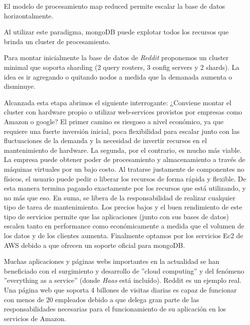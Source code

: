 El modelo de procesamiento map reduced permite escalar la base de datos horizontalmente.

Al utilizar este paradigma, mongoDB puede explotar todos los recursos que brinda un cluster de procesamiento.

Para montar inicialmente la base de datos de \emph{Reddit} proponemos un cluster minimal que soporta sharding (2 query routers, 3 config servers y 2 shards).
La idea es ir agregando o quitando nodos a medida que la demanada aumenta o disminuye.

Alcanzada esta etapa abrimos el siguiente interrogante: ¿Conviene montar el cluster con hardware propio o utilizar web-services provistos por empresas como 
Amazon o google? El primer camino es riesgoso a nivel económico, ya que requiere una fuerte inversión inicial, poca flexibilidad para escalar 
junto con las fluctuaciones de la demanda 
y la necesidad de invertir
recursos en el mantenimiento de hardware. La segunda, por el contrario, es mucho más viable. La empresa puede obtener poder de procesamiento y almacenamiento
a través de máquinas virtuales por un bajo costo. Al tratarse justamente de componentes no físicos, el usuario puede pedir o liberar los recursos de forma
rápida y flexible. De esta manera termina pagando exactamente por los recursos que está utilizando, y no más que eso. En suma, se libera de la responsabilidad
de realizar cualquier tipo de tarea de mantenimiento. Los precios bajos y el buen rendimiento de este tipo de servicios permite que las aplicaciones (junto con
sus bases de datos) escalen tanto en performance como económicamente a medida que el volumen de los datos y de los clientes aumenta. Finalmente optamos por los 
servicios Ec2 de AWS debido a que ofrecen un soporte oficial para mongoDB.

Muchas aplicaciones y páginas webs importantes en la actualidad se han beneficiado con el surgimiento y desarrollo de ''cloud computing'' y del fenómeno 
''everything as a service'' (donde \emph{Haas} está incluído). Reddit es un ejemplo real. Una página web que soporta 4 billones de visitas diarias es capaz
de funcionar con menos de 20 empleados debido a que delega gran parte de las responsabilidades necesarias para el funcionamiento de su aplicación en los 
servicios de Amazon.

